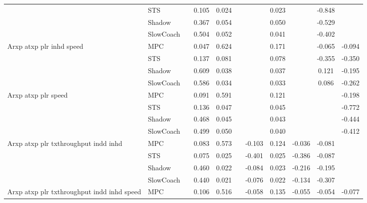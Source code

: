 \begin{tabular}{|l|l|*{9}{c|}}
                              & STS &       &     0.105 &     0.024 &     &     &  0.023 &      &  -0.848 &       \\
                              & Shadow &       &     0.367 &     0.054 &     &     &  0.050 &      &  -0.529 &       \\
                              & SlowCoach &       &     0.504 &     0.052 &     &     &  0.041 &      &  -0.402 &       \\
\midrule
Arxp atxp plr inhd speed    & MPC &       &     0.047 &     0.624 &     &     &  0.171 &      &  -0.065 &   -0.094 \\
                              & STS &       &     0.137 &     0.081 &     &     &  0.078 &      &  -0.355 &   -0.350 \\
                              & Shadow &       &     0.609 &     0.038 &     &     &  0.037 &      &   0.121 &   -0.195 \\
                              & SlowCoach &       &     0.586 &     0.034 &     &     &  0.033 &      &   0.086 &   -0.262 \\
\midrule
Arxp atxp plr speed    & MPC &       &     0.091 &     0.591 &     &     &  0.121 &      &      &   -0.198 \\
                              & STS &       &     0.136 &     0.047 &     &     &  0.045 &      &      &   -0.772 \\
                              & Shadow &       &     0.468 &     0.045 &     &     &  0.043 &      &      &   -0.444 \\
                              & SlowCoach &       &     0.499 &     0.050 &     &     &  0.040 &      &      &   -0.412 \\
\midrule
Arxp atxp plr txthroughput indd inhd    & MPC &       &     0.083 &     0.573 &     & -0.103 &  0.124 &  -0.036 &  -0.081 &       \\
                              & STS &       &     0.075 &     0.025 &     & -0.401 &  0.025 &  -0.386 &  -0.087 &       \\
                              & Shadow &       &     0.460 &     0.022 &     & -0.084 &  0.023 &  -0.216 &  -0.195 &       \\
                              & SlowCoach &       &     0.440 &     0.021 &     & -0.076 &  0.022 &  -0.134 &  -0.307 &       \\
\midrule
Arxp atxp plr txthroughput indd inhd speed    & MPC &       &     0.106 &     0.516 &     & -0.058 &  0.135 &  -0.055 &  -0.054 &   -0.077 \\

\end{tabular}
